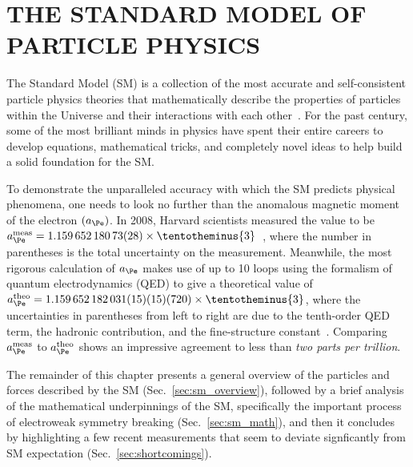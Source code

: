 \chapter{THE STANDARD MODEL OF PARTICLE PHYSICS}
\label{ch:theory}
The Standard Model (SM) is a collection of the most accurate and self-consistent particle physics theories that mathematically describe the properties of particles within the Universe and their interactions with each other~\cite{Glashow:1961tr,PhysRevLett.19.1264}.
For the past century, some of the most brilliant minds in physics have spent their entire careers to develop equations, mathematical tricks, and completely novel ideas to help build a solid foundation for the SM.

To demonstrate the unparalleled accuracy with which the SM predicts physical phenomena, one needs to look no further than the anomalous magnetic moment of the electron $\left( a_\Pe \right)$.
In 2008, Harvard scientists measured the value to be $a_\Pe^{\text{meas}} = 1.159\,652\,180\,73(28) \times \tentotheminus{3}$~\cite{Hanneke:2008tm},
where the number in parentheses is the total uncertainty on the measurement.
Meanwhile, the most rigorous calculation of $a_\Pe$ makes use of up to 10 loops using the formalism of quantum electrodynamics (QED) to give a theoretical value of $a_\Pe^{\text{theo}} = 1.159\,652\,182\,031(15)(15)(720) \times \tentotheminus{3}$,
where the uncertainties in parentheses from left to right are due to the tenth-order QED term, the hadronic contribution, and the fine-structure constant~\cite{Aoyama:2014sxa}.
Comparing $a_\Pe^{\text{meas}}$ to $a_\Pe^{\text{theo}}$ shows an impressive agreement to less than \emph{two parts per trillion}.

The remainder of this chapter presents a general overview of the particles and forces described by the SM (Sec.~\ref{sec:sm_overview}),
followed by a brief analysis of the mathematical underpinnings of the SM, specifically the important process of electroweak symmetry breaking (Sec.~\ref{sec:sm_math}),
and then it concludes by highlighting a few recent measurements that seem to deviate signficantly from SM expectation (Sec.~\ref{sec:shortcomings}).

